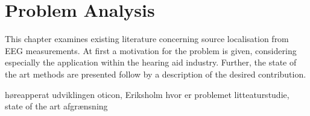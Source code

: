 \chapter{Problem Analysis}
This chapter examines existing literature concerning source localisation from EEG measurements. At first a motivation for the problem is given, considering especially the application within the hearing aid industry. Further, the state of the art methods are presented follow by a description of the desired contribution.       	     

høreapperat udviklingen oticon, Eriksholm
hvor er problemet 
litteaturstudie, state of the art 
afgrænsning
